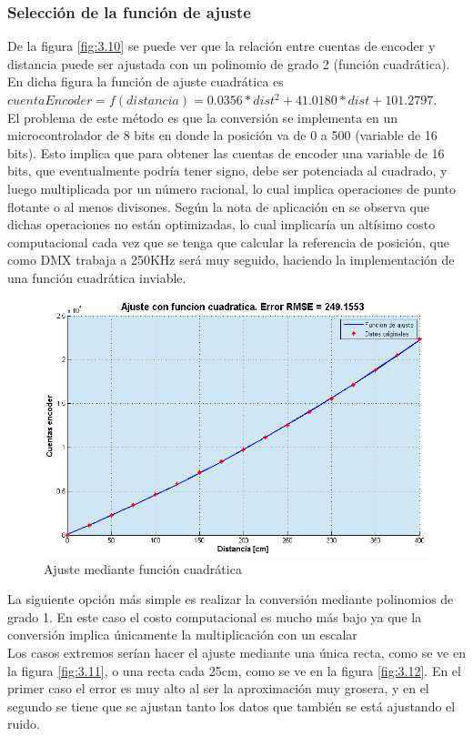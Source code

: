 \subsubsection{Selección de la función de ajuste}
De la figura \ref{fig:3.10} se puede ver que la relación entre cuentas de encoder y distancia puede ser ajustada con un polinomio de grado 2 (función cuadrática). En dicha figura la función de ajuste cuadrática es \(cuentaEncoder = f(distancia) = 0.0356*dist^2 + 41.0180*dist + 101.2797\).\\     
El problema de este método es que la conversión se implementa en un microcontrolador de 8 bits en donde la posición va de 0 a 500 (variable de 16 bits). Esto implica que para obtener las cuentas de encoder una variable de 16 bits, que eventualmente podría tener signo, debe ser potenciada al cuadrado, y luego multiplicada por un número racional, lo cual implica operaciones de punto flotante o al menos divisones. Según la nota de aplicación en \cite{sec3_3_1} se observa que dichas operaciones no están optimizadas, lo cual implicaría un altísimo costo computacional cada vez que se tenga que calcular la referencia de posición, que como DMX trabaja a 250KHz será muy seguido, haciendo la implementación de una función cuadrática inviable. \\

\begin{figure}[!ht]
	\centering
	\includegraphics[width=15cm,scale=1]{resources/3_10-ajusteCuadratico.png}
	\caption{Ajuste mediante función cuadrática}
	\label{fig:\thefigure}
\end{figure}

La siguiente opción más simple es realizar la conversión mediante polinomios de grado 1. En este caso el costo computacional es mucho más bajo ya que la conversión implica únicamente la multiplicación con un escalar \\
Los casos extremos serían hacer el ajuste mediante una única recta, como se ve en la figura \ref{fig:3.11}, o una recta cada 25cm, como se ve en la figura \ref{fig:3.12}. En el primer caso el error es muy alto al ser la aproximación muy grosera, y en el segundo se tiene que se ajustan tanto los datos que también se está ajustando el ruido. \\

